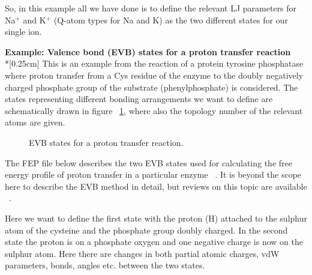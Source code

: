 \documentclass[a4paper,11pt]{article}
\newcommand{\dirfig}{./pictures}
\let\origcite\cite
\def\cite#1{\unskip~\origcite{#1}}
\let\origref\ref
\def\ref#1{\unskip~\origref{#1}}
\begin{document}
So, in this example all we have done is to define the relevant LJ
parameters for Na$^{+}$ and K$^{+}$ (Q-atom types for Na and K) as
the two different states for our single ion.

\textbf{Example: Valence bond (EVB) states for a proton transfer
reaction}\\*[0.25cm] This is an example from the reaction of a
protein tyrosine phosphatase where proton transfer from a Cys
residue of the enzyme to the doubly negatively charged phosphate
group of the substrate (phenylphosphate) is considered. The states
representing different bonding arrangements we want to define are
schematically drawn in figure \ref{fig:EVB-states}, where also the
topology number of the relevant atoms are given.

\begin{figure}[h]
\begin{center}
\caption{EVB states for a proton transfer reaction.}
\label{fig:EVB-states}
\end{center}
\end{figure}

The FEP file below describes the two EVB states used for
calculating the free energy profile of proton transfer in a
particular enzyme \cite{Kolmodin1999}. It is beyond the scope here to
describe the EVB method in detail, but reviews on this topic are
available \cite{Aqvist1993}.

Here we want to define the first state with the proton (H)
attached to the sulphur atom of the cysteine and the phosphate
group doubly charged. In the second state the proton is on a
phosphate oxygen and one negative charge is now on the sulphur
atom. Here there are changes in both partial atomic charges, vdW
parameters, bonds, angles etc. between the two states.
\end{document}
